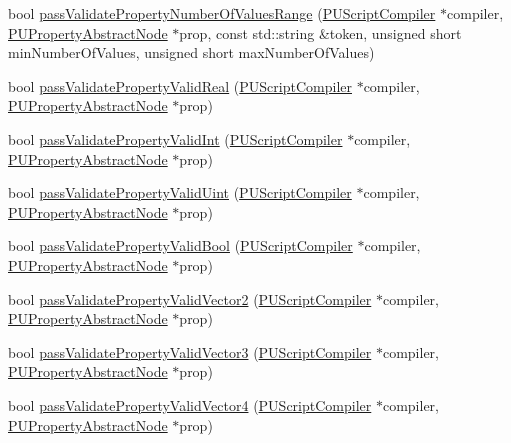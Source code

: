 \begin{DoxyCompactItemize}
\item 
bool \hyperlink{classPUScriptTranslator_a77fa0b5d20667fefead670428400026b}{pass\+Validate\+Property\+Number\+Of\+Values\+Range} (\hyperlink{classPUScriptCompiler}{P\+U\+Script\+Compiler} $\ast$compiler, \hyperlink{classPUPropertyAbstractNode}{P\+U\+Property\+Abstract\+Node} $\ast$prop, const std\+::string \&token, unsigned short min\+Number\+Of\+Values, unsigned short max\+Number\+Of\+Values)
\item 
bool \hyperlink{classPUScriptTranslator_a58b9dca1f92b31f3f881bacce1cab684}{pass\+Validate\+Property\+Valid\+Real} (\hyperlink{classPUScriptCompiler}{P\+U\+Script\+Compiler} $\ast$compiler, \hyperlink{classPUPropertyAbstractNode}{P\+U\+Property\+Abstract\+Node} $\ast$prop)
\item 
bool \hyperlink{classPUScriptTranslator_a14d7f09cb01010236a774569c20c07fa}{pass\+Validate\+Property\+Valid\+Int} (\hyperlink{classPUScriptCompiler}{P\+U\+Script\+Compiler} $\ast$compiler, \hyperlink{classPUPropertyAbstractNode}{P\+U\+Property\+Abstract\+Node} $\ast$prop)
\item 
bool \hyperlink{classPUScriptTranslator_a3f49e03627517ef0e633f90c7c775f54}{pass\+Validate\+Property\+Valid\+Uint} (\hyperlink{classPUScriptCompiler}{P\+U\+Script\+Compiler} $\ast$compiler, \hyperlink{classPUPropertyAbstractNode}{P\+U\+Property\+Abstract\+Node} $\ast$prop)
\item 
bool \hyperlink{classPUScriptTranslator_ac14e053124729ee15b9eb6ecddce28ac}{pass\+Validate\+Property\+Valid\+Bool} (\hyperlink{classPUScriptCompiler}{P\+U\+Script\+Compiler} $\ast$compiler, \hyperlink{classPUPropertyAbstractNode}{P\+U\+Property\+Abstract\+Node} $\ast$prop)
\item 
bool \hyperlink{classPUScriptTranslator_ae4a91c272452a2ca3b2b0c814132d1ec}{pass\+Validate\+Property\+Valid\+Vector2} (\hyperlink{classPUScriptCompiler}{P\+U\+Script\+Compiler} $\ast$compiler, \hyperlink{classPUPropertyAbstractNode}{P\+U\+Property\+Abstract\+Node} $\ast$prop)
\item 
bool \hyperlink{classPUScriptTranslator_a26d5b40eb43a7441b54bfd7534cff111}{pass\+Validate\+Property\+Valid\+Vector3} (\hyperlink{classPUScriptCompiler}{P\+U\+Script\+Compiler} $\ast$compiler, \hyperlink{classPUPropertyAbstractNode}{P\+U\+Property\+Abstract\+Node} $\ast$prop)
\item 
bool \hyperlink{classPUScriptTranslator_ab2c9eac05b8db1e39f208934a006518f}{pass\+Validate\+Property\+Valid\+Vector4} (\hyperlink{classPUScriptCompiler}{P\+U\+Script\+Compiler} $\ast$compiler, \hyperlink{classPUPropertyAbstractNode}{P\+U\+Property\+Abstract\+Node} $\ast$prop)

\end{DoxyCompactItemize}
